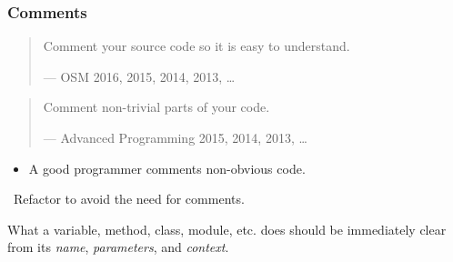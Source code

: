 \begin{frame}

\frametitle{Comments}

\begin{quotation}

\footnotesize\sffamily\itshape

\begin{flushright}

Comment your source code so it is easy to understand.

\smallbreak

\upshape

--- OSM 2016, 2015, 2014, 2013, \ldots

\end{flushright}

\end{quotation}

\begin{quotation}

\footnotesize\sffamily\itshape

\begin{flushright}

Comment non-trivial parts of your code.

\smallbreak

\upshape

--- Advanced Programming 2015, 2014, 2013, \ldots

\end{flushright}

\end{quotation}

\begin{itemize}

\item A good programmer comments non-obvious code.

\end{itemize}

\vspace{\fill}

\begin{center}

\leftthumbsup~Refactor to avoid the need for comments.~\rightthumbsup

\end{center}

\vspace{\fill}

\begin{center}

What a variable, method, class, module, etc. does should be immediately
clear from its \emph{name}, \emph{parameters}, and \emph{context}.

\end{center}

\end{frame}
